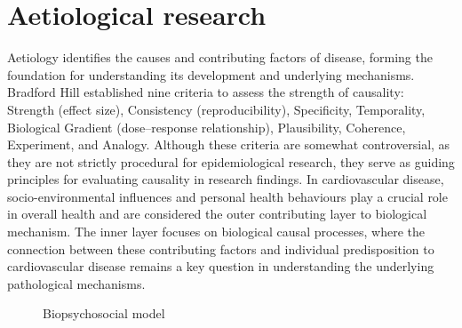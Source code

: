 \documentclass[
  a4paper,
  headsepline=true,
  open=any]{scrbook}
\begin{document}

\hypertarget{aetiological-research}{%
\chapter{Aetiological research}\label{aetiological-research}}

Aetiology identifies the causes and contributing factors of disease,
forming the foundation for understanding its development and underlying
mechanisms. Bradford Hill established nine criteria to assess the
strength of causality: Strength (effect size), Consistency
(reproducibility), Specificity, Temporality, Biological Gradient
(dose--response relationship), Plausibility, Coherence, Experiment, and
Analogy. Although these criteria are somewhat controversial, as they are
not strictly procedural for epidemiological research, they serve as
guiding principles for evaluating causality in research findings. In
cardiovascular disease, socio-environmental influences and personal
health behaviours play a crucial role in overall health and are
considered the outer contributing layer to biological mechanism. The
inner layer focuses on biological causal processes, where the connection
between these contributing factors and individual predisposition to
cardiovascular disease remains a key question in understanding the
underlying pathological mechanisms.

\begin{figure}

\begin{minipage}[t]{\linewidth}

{\centering 


\caption{Biopsychosocial model}

}

\end{minipage}%

\end{figure}
\end{document}
